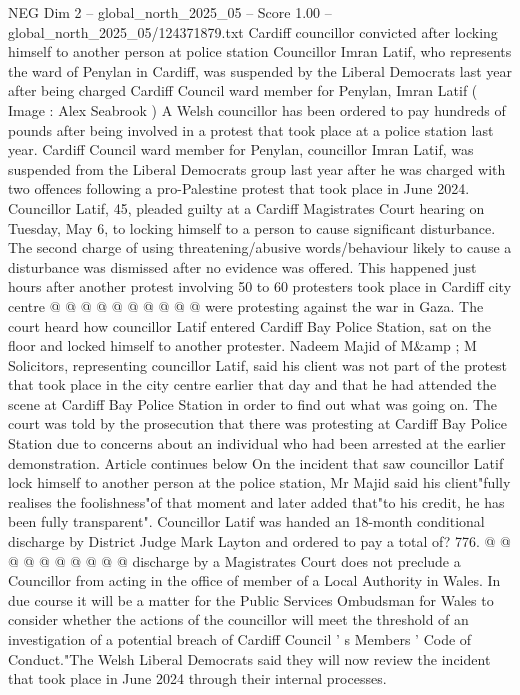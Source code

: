 \begin{textsample}{NEG Dim 2 – global\_north\_2025\_05 – Score 1.00 – global\_north\_2025\_05/124371879.txt}  \label{ex:f2_neg_232}
Cardiff councillor convicted after locking himself to another person at police station Councillor Imran Latif, who represents the ward of Penylan in Cardiff, was suspended by the Liberal Democrats last year after being charged Cardiff Council ward member for Penylan, Imran Latif ( Image : Alex Seabrook ) A Welsh councillor has been ordered to pay hundreds of pounds after being involved in a protest that took place at a police station last year.
Cardiff Council ward member for Penylan, councillor Imran Latif, was suspended from the Liberal Democrats group last year after he was charged with two offences following a pro-Palestine protest that took place in June 2024.
Councillor Latif, 45, pleaded guilty at a Cardiff Magistrates Court hearing on Tuesday, May 6, to locking himself to a person to cause significant disturbance.
The second charge of using threatening/abusive words/behaviour likely to cause a disturbance was dismissed after no evidence was offered.
This happened just hours after another protest involving 50 to 60 protesters took place in Cardiff city centre @ @ @ @ @ @ @ @ @ @ were protesting against the war in Gaza.
The court heard how councillor Latif entered Cardiff Bay Police Station, sat on the floor and locked himself to another protester.
Nadeem Majid of M\&amp ; M Solicitors, representing councillor Latif, said his client was not part of the protest that took place in the city centre earlier that day and that he had attended the scene at Cardiff Bay Police Station in order to find out what was going on.
The court was told by the prosecution that there was protesting at Cardiff Bay Police Station due to concerns about an individual who had been arrested at the earlier demonstration.
Article continues below On the incident that saw councillor Latif lock himself to another person at the police station, Mr Majid said his client"fully realises the foolishness"of that moment and later added that"to his credit, he has been fully transparent".
Councillor Latif was handed an 18-month conditional discharge by District Judge Mark Layton and ordered to pay a total of? 776. @ @ @ @ @ @ @ @ @ @ discharge by a Magistrates Court does not preclude a Councillor from acting in the office of member of a Local Authority in Wales.
In due course it will be a matter for the Public Services Ombudsman for Wales to consider whether the actions of the councillor will meet the threshold of an investigation of a potential breach of Cardiff Council ' s Members ' Code of Conduct."The Welsh Liberal Democrats said they will now review the incident that took place in June 2024 through their internal processes.

\end{textsample}
